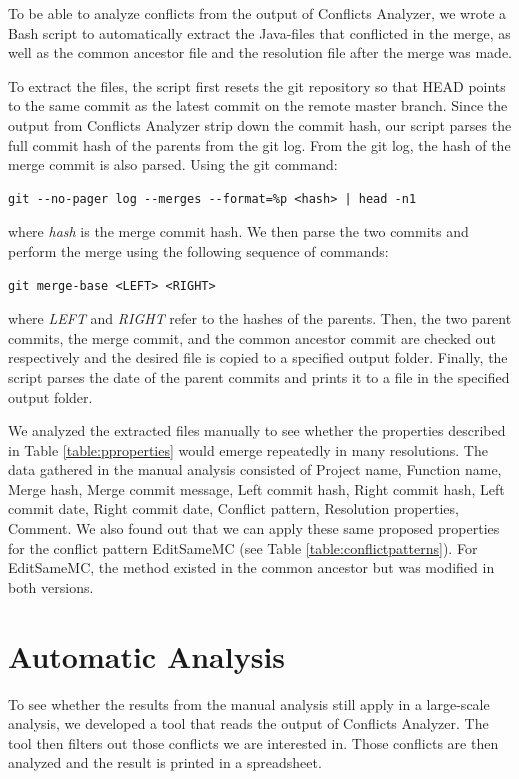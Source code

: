 To be able to analyze conflicts from the output of Conflicts Analyzer, we wrote a Bash script to automatically extract the Java-files that conflicted in the merge, as well as the common ancestor file and the resolution file after the merge was made.

To extract the files, the script first resets the git repository so that HEAD points to the same commit as the latest commit on the remote master branch. Since the output from Conflicts Analyzer strip down the commit hash, our script parses the full commit hash of the parents from the git log. From the git log, the hash of the merge commit is also parsed. Using the git command:
\lstset{language=Bash,numbers=left,xleftmargin=2em,frame=single,framexleftmargin=1.5em}
\begin{lstlisting}[frame=single,breaklines=true,tabsize=2]
git --no-pager log --merges --format=%p <hash> | head -n1
\end{lstlisting}
where \textit{hash} is the merge commit hash. We then parse the two commits and perform the merge using the following sequence of commands:\\
\lstset{language=Bash,numbers=left,xleftmargin=2em,frame=single,framexleftmargin=1.5em}
\begin{lstlisting}[frame=single,breaklines=true,tabsize=2]
git merge-base <LEFT> <RIGHT>
\end{lstlisting}
where \textit{LEFT} and \textit{RIGHT} refer to the hashes of the parents.  Then, the two parent commits, the merge commit, and the common ancestor commit are checked out respectively and the desired file is copied to a specified output folder. Finally, the script parses the date of the parent commits and prints it to a file in the specified output folder.

We analyzed the extracted files manually to see whether the properties described in Table \ref{table:pproperties} would emerge repeatedly in many resolutions. The data gathered in the manual analysis consisted of Project name, Function name, Merge hash, Merge commit message, Left commit hash, Right commit hash, Left commit date, Right commit date, Conflict pattern, Resolution properties, Comment. We also found out that we can apply these same proposed properties for the conflict pattern EditSameMC (see Table \ref{table:conflictpatterns}). For EditSameMC, the method existed in the common ancestor but was modified in both versions.
\FloatBarrier
\section{Automatic Analysis}
To see whether the results from the manual analysis still apply in a large-scale analysis, we developed a tool that reads the output of Conflicts Analyzer. The tool then filters out those conflicts we are interested in. Those conflicts are then analyzed and the result is printed in a spreadsheet.

